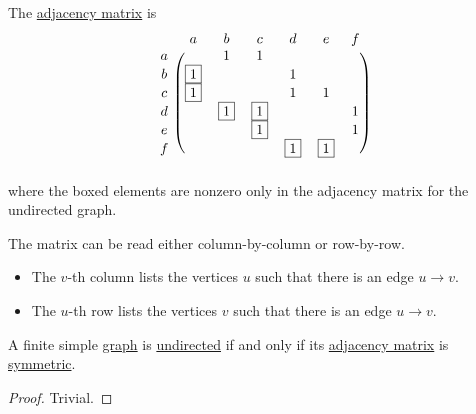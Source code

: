 \begin{example}
  The \hyperref[def:graph_adjacency_matrix]{adjacency matrix} is
  \begin{equation}\label{ex:def:graph_adjacency_matrix}
    \begin{blockarray}{cccccccc}
        & a        & b        & c        & d        & e        & f \\
    \begin{block}{c(ccccccc)}
      a &          & 1        & 1        &          &          &   \\
      b & \fbox{1} &          &          & 1        &          &   \\
      c & \fbox{1} &          &          & 1        & 1        &   \\
      d &          & \fbox{1} & \fbox{1} &          &          & 1 \\
      e &          &          & \fbox{1} &          &          & 1 \\
      f &          &          &          & \fbox{1} & \fbox{1} &   \\
    \end{block}
    \end{blockarray}
  \end{equation}
  where the boxed elements are nonzero only in the adjacency matrix for the undirected graph.

  The matrix can be read either column-by-column or row-by-row.
  \begin{itemize}
    \item The \( v \)-th column lists the vertices \( u \) such that there is an edge \( u \to v \).
    \item The \( u \)-th row lists the vertices \( v \) such that there is an edge \( u \to v \).
  \end{itemize}
\end{example}

\begin{proposition}\label{thm:graph_undirected_iff_adjacency_matrix_is_symmetric}
  A finite simple \hyperref[def:graph]{graph} is \hyperref[def:graph/simple_undirected]{undirected} if and only if its \hyperref[def:graph_adjacency_matrix]{adjacency matrix} is \hyperref[def:symmetric_matrix]{symmetric}.
\end{proposition}
\begin{proof}
  Trivial.
\end{proof}


